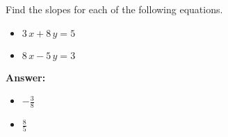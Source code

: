  Find the slopes for each of the following equations. \begin{itemize}\item \( 3 \, x + 8 \, y = 5 \)\item \( 8 \, x - 5 \, y = 3 \)\end{itemize}

        \textbf{Answer:} \begin{itemize}\item \( -\frac{3}{8} \)\item \( \frac{8}{5} \)\end{itemize}
